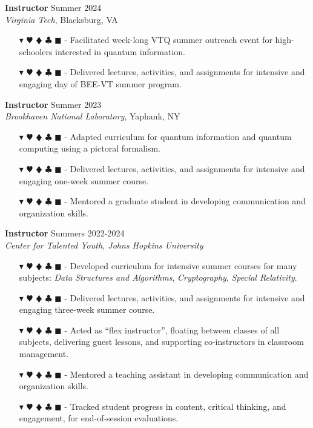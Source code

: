 \documentclass[overlapped, 10pt]{res} %
\newcommand{\physics}{$\blacktriangledown$}
\newcommand{\biochem}{$\varheartsuit$}
\newcommand{\shannon}{$\vardiamondsuit$}
\newcommand{\classic}{$\clubsuit$}
\newcommand{\quantum}{$\blacksquare$}
\newcommand{\physicscolor}{\color{YellowOrange}}
\newcommand{\biochemcolor}{\color{Emerald}}
\newcommand{\shannoncolor}{\color{Goldenrod}}
\newcommand{\classiccolor}{\color{Cyan}}
\newcommand{\quantumcolor}{\color{RedOrange}}
\newcommand{\tag}[1]{
    {\IfSubStr{#1}{\physics}{\physicscolor}{\color{White}}\physics}
    {\IfSubStr{#1}{\biochem}{\biochemcolor}{\color{White}}\biochem}
    {\IfSubStr{#1}{\shannon}{\shannoncolor}{\color{White}}\shannon}
    {\IfSubStr{#1}{\classic}{\classiccolor}{\color{White}}\classic}
    {\IfSubStr{#1}{\quantum}{\quantumcolor}{\color{White}}\quantum}
}
\begin{document}
\begin{resume}
\textbf{Instructor} \hfill Summer 2024 \\
\textit{Virginia Tech}, Blacksburg, VA
\begin{itemize} \itemsep -2pt %
\item[\tag{\physics\shannon\quantum}-] Facilitated week-long VTQ summer outreach event for high-schoolers interested in quantum information.
\item[\tag{\physics\shannon\quantum}-] Delivered lectures, activities, and assignments for intensive and engaging day of BEE-VT summer program.
\end{itemize}

\textbf{Instructor} \hfill Summer 2023 \\
\textit{Brookhaven National Laboratory}, Yaphank, NY
\begin{itemize} \itemsep -2pt %
\item[\tag{\physics\shannon\quantum}-] Adapted curriculum for quantum information and quantum computing using a pictoral formalism.
\item[\tag{\physics\shannon\quantum}-] Delivered lectures, activities, and assignments for intensive and engaging one-week summer course.
\item[\tag{}-] Mentored a graduate student in developing communication and organization skills.
\end{itemize}

\textbf{Instructor} \hfill Summers 2022-2024 \\
\textit{Center for Talented Youth, Johns Hopkins University}
\begin{itemize} \itemsep -2pt %
\item[\tag{\physics\shannon\classic}-] Developed curriculum for intensive summer courses for many subjects: \textit{Data Structures and Algorithms}, \textit{Cryptography}, \textit{Special Relativity}.
\item[\tag{\classic}-] Delivered lectures, activities, and assignments for intensive and engaging three-week summer course.
\item[\tag{}-] Acted as ``flex instructor'', floating between classes of all subjects, delivering guest lessons, and supporting co-instructors in classroom management.
\item[\tag{}-] Mentored a teaching assistant in developing communication and organization skills.
\item[\tag{}-] Tracked student progress in content, critical thinking, and engagement, for end-of-session evaluations.
\end{itemize}


\end{resume}
\end{document}

